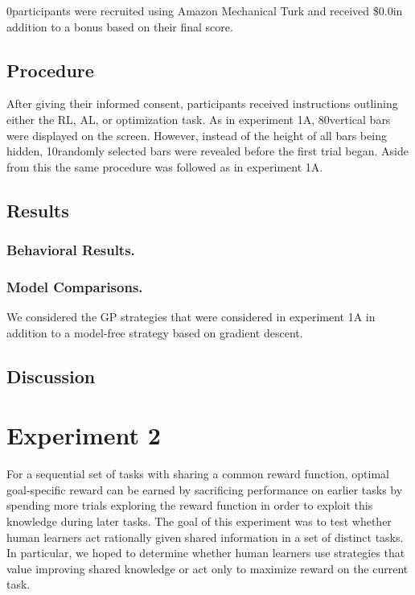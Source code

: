 \documentclass[10pt,letterpaper]{article}
\def\numbars{80}
\def\basepay{\$0.0}
\def\numpartB{0}
\def\numsamples{10}
\begin{document}
	\numpartB \space participants were recruited using Amazon Mechanical Turk and received \basepay \space in addition to a bonus based on their final score.
	
	\subsection{Procedure}
	
	After giving their informed consent, participants received instructions outlining either the RL, AL, or optimization task. As in experiment 1A, \numbars \space vertical bars were displayed on the screen. However, instead of the height of all bars being hidden, \numsamples \space randomly selected bars were revealed before the first trial began. Aside from this the same procedure was followed as in experiment 1A.
	
	\subsection{Results}
	
	\subsubsection{Behavioral Results.}
	
	\subsubsection{Model Comparisons.}
	
	We considered the GP strategies that were considered in experiment 1A in addition to a model-free strategy based on gradient descent.
	
	\subsection{Discussion}
	
	\section{Experiment 2}
	
	For a sequential set of tasks with sharing a common reward function, optimal goal-specific reward can be earned by sacrificing performance on earlier tasks by spending more trials exploring the reward function in order to exploit this knowledge during later tasks. The goal of this experiment was to test whether human learners act rationally given shared information in a set of distinct tasks. In particular, we hoped to determine whether human learners use strategies that value improving shared knowledge or act only to maximize reward on the current task.
	
\end{document}
